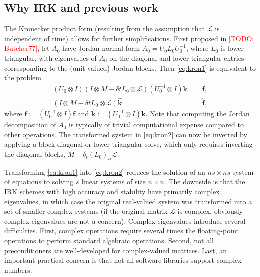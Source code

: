 \documentclass[review]{siamart}
\makeatletter
\newcommand{\todo}[1]{\textcolor{red}{[TODO\@: #1]}}
\makeatother
\begin{document}
\subsection{Why IRK and previous work}\label{sec:intro:prev}


The Kronecker product form (resulting from the assumption that $\mathcal{L}$ is independent of
time) allows for further simplifications. First proposed in \todo{Butcher77}, let $A_0$ have
Jordan normal form $A_0 = U_0L_0U_0^{-1}$, where $L_0$ is lower triangular, with eigenvalues
of $A_0$ on the diagonal and lower triangular entries corresponding to the (unit-valued)
Jordan blocks. Then \eqref{eq:kron1} is equivalent to the problem
%
\begin{align}\label{eq:kron2}
(U_0\otimes I)(I\otimes M - \delta t L_0\otimes \mathcal{L})(U_0^{-1}\otimes I)\mathbf{k} & = \mathbf{f},\\
(I\otimes M - \delta t L_0\otimes \mathcal{L})\hat{\mathbf{k}} & = \hat{\mathbf{f}},
\end{align}
%
where $\hat{\mathbf{f}} := (U_0^{-1}\otimes I)\mathbf{f}$ and
$\hat{\mathbf{k}} := (U_0^{-1}\otimes I)\mathbf{k}$. Note that computing the Jordan
decomposition of $A_0$ is typically of trivial computational expense compared to other
operations. The transformed system in \eqref{eq:kron2} can now be inverted by applying
a block diagonal or lower triangular solve, which only requires inverting the diagonal
blocks, $M - \delta_t(L_0)_{ii}\mathcal{L}$.

Transforming \eqref{eq:kron1} into \eqref{eq:kron2} reduces the solution of an $ns\times ns$
system of equations to solving $s$ linear systems of size $n\times n$. The downside is that the
IRK schemes with high accuracy and stability have primarily complex eigenvalues, in which case
the original real-valued system was transformed into a set of smaller complex systems (if the
original matrix $\mathcal{L}$ is complex, obviously complex eigenvalues are not a concern).
Complex eigenvalues introduce several difficulties. First, complex operations require several
times the floating-point operations to perform standard algebraic operations. Second, not
all preconditioners are well-developed for complex-valued matrices. Last, an important
practical concern is that not all software libraries support complex numbers. 
\end{document}
